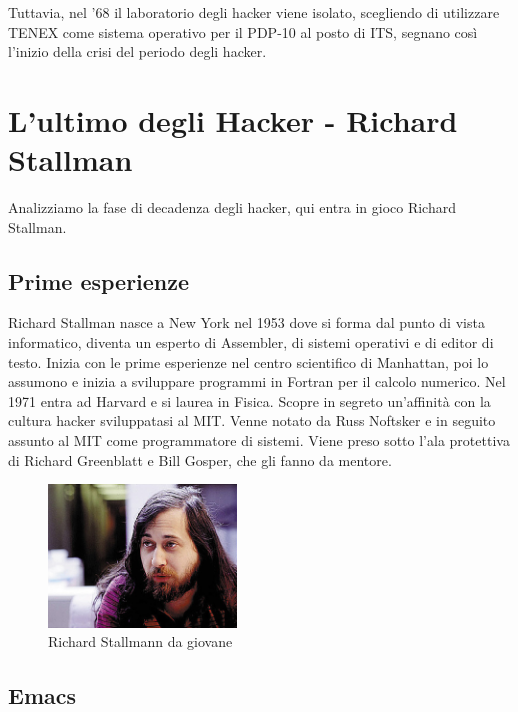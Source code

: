 Tuttavia, nel '68 il laboratorio degli hacker viene isolato, scegliendo di utilizzare TENEX come sistema operativo per il PDP-10 al posto di ITS, segnano così l'inizio della crisi del periodo degli hacker.

\section{L'ultimo degli Hacker - Richard Stallman}

Analizziamo la fase di decadenza degli hacker, qui entra in gioco Richard Stallman.

\subsection{Prime esperienze}

Richard Stallman nasce a New York nel 1953 dove si forma dal punto di vista informatico, diventa un esperto di Assembler, di sistemi operativi e di editor di testo. Inizia con le prime esperienze nel centro scientifico di Manhattan, poi lo assumono e inizia a sviluppare programmi in Fortran per il calcolo numerico. Nel 1971 entra ad Harvard e si laurea in Fisica. Scopre in segreto un'affinità con la cultura hacker sviluppatasi al MIT. Venne notato da Russ Noftsker e in seguito assunto al MIT come programmatore di sistemi. Viene preso sotto l'ala protettiva di Richard Greenblatt e Bill Gosper, che gli fanno da mentore.

\begin{figure}[htbp]
	\centering
	\includegraphics[width=50mm]{images/stallman.jpg}
	\caption{Richard Stallmann da giovane}
\end{figure}

\subsection{Emacs}

